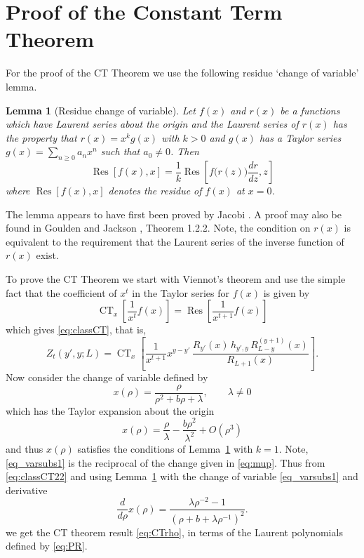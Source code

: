\documentclass[11pt,a4paper]{article}
\DeclareMathOperator{\CT}{CT}
\DeclareMathOperator{\res}{\text{Res}}
\newtheorem{lemma}{Lemma}[section]
\newcommand{\la}{\lambda}
\newcommand{\p}{\rho}
\newcommand{\recip}[1]{R}		%
\begin{document}
\section{Proof of the Constant Term Theorem}	%
\label{sec_resProof}
 
For the proof of the CT Theorem   we use the following residue `change of variable' lemma. 
%
\begin{lemma}[Residue change of variable] 
\label{lem:changeVars}
 Let $f(x)$  and $r(x)$ be a functions  which have Laurent series about the origin and the Laurent series of $r(x)$ has the property that $r(x)=x^k g(x) $ with $k>0$ and $g(x)$ has a Taylor series  $g(x)=\sum_{n\ge 0}a_n x^n$ such that  $a_0\ne0$. 	Then 
\begin{equation}
 \res \left [ f(x),x\right ] =\frac{1}{k} \res \left [f\bigl(r(z)\bigr)\frac{dr}{dz} , z\right ]
\label{eq_varchange}
\end{equation}
where $\res \left [ f(x), x\right ]$ denotes the residue of $f(x)$ at $x=0$.
\end{lemma}
%
The lemma appears to have first been proved by Jacobi \cite{jacobi:1830ai}. A proof may also be found in Goulden and Jackson \cite{goulden:1986kx}, Theorem 1.2.2. Note, the condition on $r(x)$ is equivalent to the requirement that the Laurent series of the inverse function of $r(x)$ exist.
	
To prove the CT Theorem  we  start with Viennot's theorem and use   the simple fact that the coefficient of $x^t$ in the Taylor series for $f(x)$ is given by
\begin{equation}\label{eq:ctres}
	 \CT_x\left[\frac{1}{x^t}f(x)\right]=\res\left[\frac{1}{x^{t+1}}f(x)\right]
\end{equation}
which gives \eqref{eq:classCT}, that is,
\begin{equation}\label{eq:classCT22}
	Z_t(y',y;L)= \CT_x\left[\frac{1}{x^{t+1}}x^{y-y'}\,\frac{\recip{P}_{y'}(x)\,h_{y',y}\, \recip{P}^{(y+1)}_{L-y}(x)}{\recip{P}_{L+1}(x)}\right].
\end{equation}
Now consider the change of variable   defined   by
\begin{equation} 
x(\p) = \frac{\p}{\p^2+b\p+ \la },\qquad \lambda\ne0
\label{eq_varsubs1}
\end{equation}
which has the Taylor expansion about the origin
\[
	x(\p) =\frac{\rho }{\lambda }-\frac{b \rho ^2}{\lambda^2}+O\left(\rho ^3\right) 
\] 
and thus $x(\p)$ satisfies the conditions of   Lemma~\ref{lem:changeVars} with  $k=1$. Note, \eqref{eq_varsubs1} is the reciprocal of the change given in \eqref{eq:mup}.  Thus from  \eqref{eq:classCT22} and using   Lemma~\ref{lem:changeVars} with the change of variable \eqref{eq_varsubs1} and derivative
\begin{equation} \label{eq:dxdp}
\frac{d}{d\p}x(\p) = \frac{\la \p^{-2}-1}{(\p+b+\la \p^{-1})^2}.
\end{equation}
we get  the CT theorem result  \eqref{eq:CTrho}, in terms of the Laurent polynomials defined by \eqref{eq:PR}.
 
\end{document}
